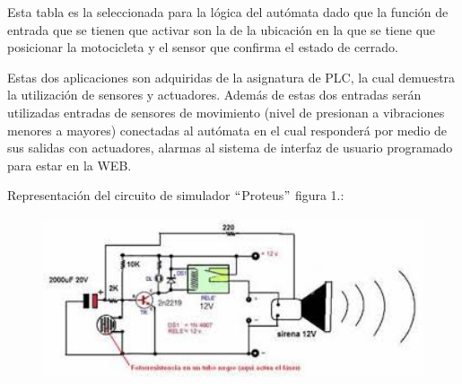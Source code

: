 \documentclass[12pt]{article}
\begin{document}
\vspace{\baselineskip}
{\fontsize{11pt}{13.2pt}\selectfont Esta tabla es la seleccionada para la lógica del autómata dado que la función de entrada que se tienen que activar son la de la ubicación en la que se tiene que posicionar la motocicleta y el sensor que confirma el estado de cerrado.\par}\par


\vspace{\baselineskip}
{\fontsize{11pt}{13.2pt}\selectfont Estas dos aplicaciones son adquiridas de la asignatura de PLC, la cual demuestra la utilización de sensores y actuadores. Además de estas dos entradas serán utilizadas entradas de sensores de movimiento (nivel de presionan a vibraciones menores a mayores) conectadas al autómata en el cual responderá por medio de sus salidas con actuadores, alarmas al sistema de interfaz de usuario programado para estar en la WEB.\par}\par


\vspace{\baselineskip}
{\fontsize{11pt}{13.2pt}\selectfont Representación del circuito de simulador $``$Proteus$"$  figura 1.:\par}\par


\vspace{\baselineskip}



\begin{figure}[H]
	\begin{Center}
		\includegraphics[width=5.06in,height=1.88in]{./media/image9.png}
	\end{Center}
\end{figure}



\par
\end{document}
